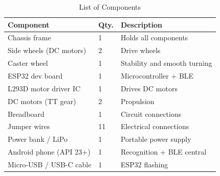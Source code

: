 \begin{table}[htbp]
\caption{List of Components}
\centering
\begin{tabular}{lll}
\toprule
\textbf{Component}       & \textbf{Qty.} & \textbf{Description} \\
\midrule
Chassis frame            & 1  & Holds all components \\
Side wheels (DC motors)  & 2  & Drive wheels \\
Caster wheel             & 1  & Stability and smooth turning \\
ESP32 dev board          & 1  & Microcontroller + BLE \\
L293D motor driver IC    & 1  & Drives DC motors \\
DC motors (TT gear)      & 2  & Propulsion \\
Breadboard               & 1  & Circuit connections \\
Jumper wires             & 11 & Electrical connections \\
Power bank / LiPo        & 1  & Portable power supply \\
Android phone (API 23+)  & 1  & Recognition + BLE central \\
Micro-USB / USB-C cable  & 1  & ESP32 flashing \\
\bottomrule
\end{tabular}
\label{tab:components}
\end{table}